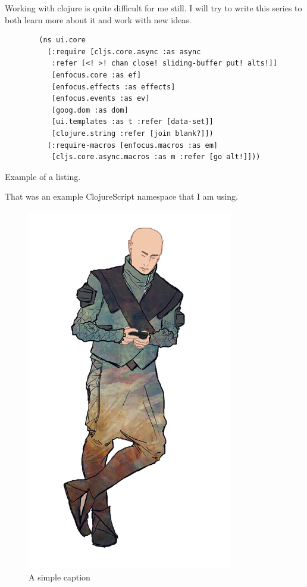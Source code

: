 

\newcommand{\currentPostTitle}{Testing \LaTeX}
\newcommand{\currentPostSubTitle}{text to insert}
\newcommand{\latestKnownVersion}{V0.1}




Working with clojure is quite difficult for me still. I will try to write this series to both learn more about it and work with new ideas.

\begin{listing}[H]
	\begin{verbatim}
		(ns ui.core
		  (:require [cljs.core.async :as async
		   :refer [<! >! chan close! sliding-buffer put! alts!]]
		   [enfocus.core :as ef]
		   [enfocus.effects :as effects]
		   [enfocus.events :as ev]
		   [goog.dom :as dom]
		   [ui.templates :as t :refer [data-set]]
		   [clojure.string :refer [join blank?]])
		  (:require-macros [enfocus.macros :as em]
		   [cljs.core.async.macros :as m :refer [go alt!]]))	
	\end{verbatim}
	\caption{Example of a listing.}
	\label{lst:example}
\end{listing}

That was an example ClojureScript namespace that I am using.

\begin{figure}[ht!]
	\centering
	\includegraphics[width=90mm]{assets/presentation-pic-3.jpg}
	\caption{A simple caption}
	\label{overflow}
\end{figure}


